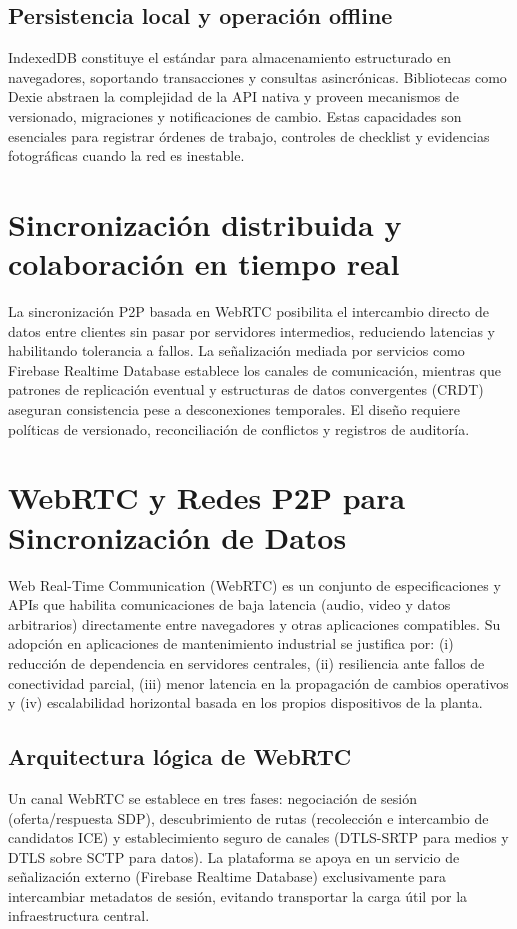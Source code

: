 \documentclass[12pt,a4paper]{report}
\begin{document}
\subsection*{Persistencia local y operación offline}
IndexedDB constituye el estándar para almacenamiento estructurado en navegadores, soportando transacciones y consultas asincrónicas. Bibliotecas como Dexie abstraen la complejidad de la API nativa y proveen mecanismos de versionado, migraciones y notificaciones de cambio. Estas capacidades son esenciales para registrar órdenes de trabajo, controles de checklist y evidencias fotográficas cuando la red es inestable.

\section*{Sincronización distribuida y colaboración en tiempo real}
La sincronización P2P basada en WebRTC posibilita el intercambio directo de datos entre clientes sin pasar por servidores intermedios, reduciendo latencias y habilitando tolerancia a fallos. La señalización mediada por servicios como Firebase Realtime Database establece los canales de comunicación, mientras que patrones de replicación eventual y estructuras de datos convergentes (CRDT) aseguran consistencia pese a desconexiones temporales. El diseño requiere políticas de versionado, reconciliación de conflictos y registros de auditoría.

\section*{WebRTC y Redes P2P para Sincronización de Datos}
Web Real-Time Communication (WebRTC) es un conjunto de especificaciones y APIs que habilita comunicaciones de baja latencia (audio, video y datos arbitrarios) directamente entre navegadores y otras aplicaciones compatibles. Su adopción en aplicaciones de mantenimiento industrial se justifica por: (i) reducción de dependencia en servidores centrales, (ii) resiliencia ante fallos de conectividad parcial, (iii) menor latencia en la propagación de cambios operativos y (iv) escalabilidad horizontal basada en los propios dispositivos de la planta.

\subsection*{Arquitectura lógica de WebRTC}
Un canal WebRTC se establece en tres fases: negociación de sesión (oferta/respuesta SDP), descubrimiento de rutas (recolección e intercambio de candidatos ICE) y establecimiento seguro de canales (DTLS-SRTP para medios y DTLS sobre SCTP para datos). La plataforma se apoya en un servicio de señalización externo (Firebase Realtime Database) exclusivamente para intercambiar metadatos de sesión, evitando transportar la carga útil por la infraestructura central.
\end{document}
